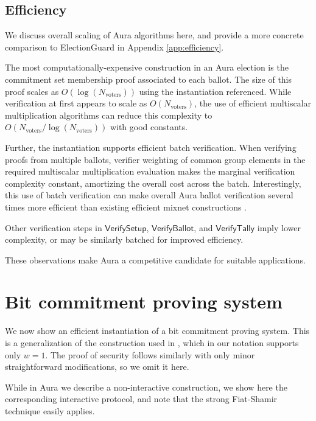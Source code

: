 \documentclass{llncs}
\newcommand{\func}[1]{\mathsf{#1}}
\begin{document}
\subsection{Efficiency}

We discuss overall scaling of Aura algorithms here, and provide a more concrete comparison to ElectionGuard in Appendix \ref{app:efficiency}.

The most computationally-expensive construction in an Aura election is the commitment set membership proof associated to each ballot.
The size of this proof scales as $O(\log(N_{\text{voters}}))$ using the instantiation referenced.
While verification at first appears to scale as $O(N_{\text{voters}})$, the use of efficient multiscalar multiplication algorithms \cite{pippenger} can reduce this complexity to $O(N_{\text{voters}}/\log(N_{\text{voters}}))$ with good constants.

Further, the instantiation supports efficient batch verification.
When verifying proofs from multiple ballots, verifier weighting of common group elements in the required multiscalar multiplication evaluation makes the marginal verification complexity constant, amortizing the overall cost across the batch.
Interestingly, this use of batch verification can make overall Aura ballot verification several times more efficient than existing efficient mixnet constructions \cite{efficient_shuffle,groth_shuffle}.

Other verification steps in $\func{VerifySetup}$, $\func{VerifyBallot}$, and $\func{VerifyTally}$ imply lower complexity, or may be similarly batched for improved efficiency.

These observations make Aura a competitive candidate for suitable applications.






\appendix


\section{Bit commitment proving system}
\label{app:bit}

We now show an efficient instantiation of a bit commitment proving system.
This is a generalization of the construction used in \cite{bootle}, which in our notation supports only $w = 1$.
The proof of security follows similarly with only minor straightforward modifications, so we omit it here.

While in Aura we describe a non-interactive construction, we show here the corresponding interactive protocol, and note that the strong Fiat-Shamir technique easily applies.
\end{document}

